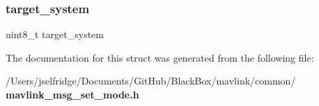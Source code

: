 \mbox{\label{struct____mavlink__set__mode__t_ac9afff43526a157e4c4e45607c1418b8}} 
\subsubsection{target\+\_\+system}
{\footnotesize\ttfamily uint8\+\_\+t target\+\_\+system}



The documentation for this struct was generated from the following file\+:\begin{DoxyCompactItemize}
\item 
/\+Users/jselfridge/\+Documents/\+Git\+Hub/\+Black\+Box/mavlink/common/\textbf{ mavlink\+\_\+msg\+\_\+set\+\_\+mode.\+h}\end{DoxyCompactItemize}
